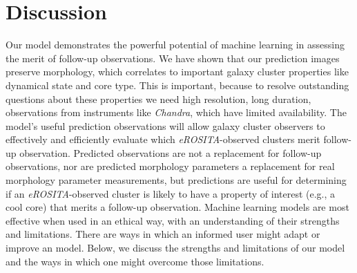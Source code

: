 \documentclass[twocolumn, 11pt]{aastex63}%
\begin{document}
\section{Discussion}\label{discussion}
Our model demonstrates the powerful potential of machine learning in assessing the merit of follow-up observations. We have shown that our prediction images preserve morphology, which correlates to important galaxy cluster properties like dynamical state and core type. This is important, because to resolve outstanding questions about these properties we need high resolution, long duration, observations from instruments like \textit{Chandra}, which have limited availability. The model's useful prediction observations will allow galaxy cluster observers to effectively and efficiently evaluate which \textit{eROSITA}-observed clusters merit follow-up observation. Predicted observations are not a replacement for follow-up observations, nor are predicted morphology parameters a replacement for real morphology parameter measurements, but predictions are useful for determining if an \textit{eROSITA}-observed cluster is likely to have a property of interest (e.g., a cool core) that merits a follow-up observation. Machine learning models are most effective when used in an ethical way, with an understanding of their strengths and limitations. There are ways in which an informed user might adapt or improve an model. Below, we discuss the strengths and limitations of our model and the ways in which one might overcome those limitations.
\end{document}
